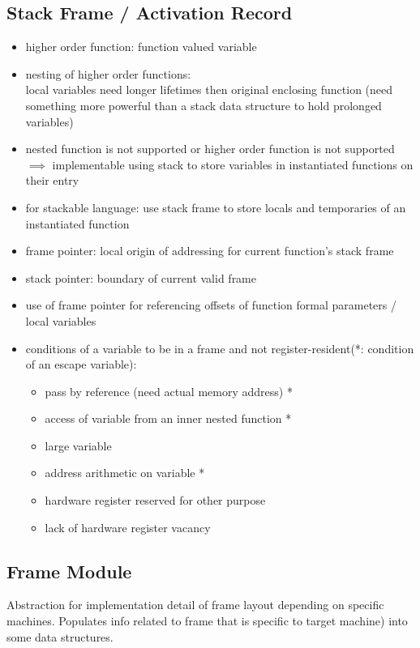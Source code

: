 \documentclass[8pt]{extarticle}
\begin{document}
\begin{multicols*}{2}
  \section{Stack Frame / Activation Record}
  \begin{itemize}
  \item higher order function: function valued variable
  \item nesting of higher order functions:\\
    local variables need longer lifetimes then original enclosing function (need something more powerful than a stack data structure to hold prolonged variables)
  \item nested function is not supported or higher order function is not supported $\implies$ implementable using stack to store variables in instantiated functions on their entry
  \item for stackable language: use stack frame to store locals and temporaries of an instantiated function
  \item frame pointer: local origin of addressing for current function's stack frame
  \item stack pointer: boundary of current valid frame
  \item use of frame pointer for referencing offsets of function formal parameters / local variables
  \item conditions of a variable to be in a frame and not register-resident(*: condition of an escape variable):
    \begin{itemize}
    \item pass by reference (need actual memory address) *
    \item access of variable from an inner nested function *
    \item large variable
    \item address arithmetic on variable *
    \item hardware register reserved for other purpose
    \item lack of hardware register vacancy
    \end{itemize}
  \end{itemize}

  \subsection{Frame Module}
  Abstraction for implementation detail of frame layout depending on specific machines. Populates info related to frame that is specific to target machine) into some data structures.
  

\end{multicols*}
\end{document}
